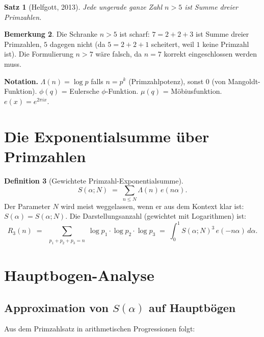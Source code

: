 \documentclass[12pt,a4paper]{amsart}
\newtheorem{theorem}{Satz}[section]
\theoremstyle{definition}
\newtheorem{definition}[theorem]{Definition}
\newtheorem{bemerkung}[theorem]{Bemerkung}
\newcommand{\eq}[1]{e\!\left(#1\right)}
\begin{document}
\begin{theorem}[Helfgott, 2013]\label{thm:helfgott}
  Jede ungerade ganze Zahl $n > 5$ ist Summe dreier Primzahlen.
\end{theorem}

\begin{bemerkung}
  Die Schranke $n > 5$ ist scharf: $7 = 2+2+3$ ist Summe dreier Primzahlen,
  $5$ dagegen nicht (da $5 = 2+2+1$ scheitert, weil $1$ keine Primzahl ist).
  Die Formulierung $n > 7$ wäre falsch, da $n=7$ korrekt eingeschlossen werden muss.
\end{bemerkung}

\textbf{Notation.}
$\Lambda(n) = \log p$ falls $n = p^k$ (Primzahlpotenz), sonst $0$
(von Mangoldt-Funktion).  $\phi(q)$ = Eulersche $\phi$-Funktion.
$\mu(q)$ = Möbiusfunktion.  $\eq{x} = e^{2\pi ix}$.

\section{Die Exponentialsumme über Primzahlen}
\label{sec:expsum}

\begin{definition}[Gewichtete Primzahl-Exponentialsumme]
  \[
    S(\alpha;N) \;=\; \sum_{n \leq N} \Lambda(n)\, \eq{n\alpha}.
  \]
  Der Parameter $N$ wird meist weggelassen, wenn er aus dem Kontext klar ist:
  $S(\alpha) = S(\alpha;N)$.
  Die Darstellungsanzahl (gewichtet mit Logarithmen) ist:
  \[
    R_3(n) \;=\; \sum_{\substack{p_1 + p_2 + p_3 = n}} \log p_1 \cdot \log p_2 \cdot \log p_3
    \;=\; \int_0^1 S(\alpha;N)^3\, \eq{-n\alpha}\, d\alpha.
  \]
\end{definition}

\section{Hauptbogen-Analyse}
\label{sec:hauptbogen}

\subsection{Approximation von $S(\alpha)$ auf Hauptbögen}

Aus dem Primzahlsatz in arithmetischen Progressionen folgt:
\end{document}
